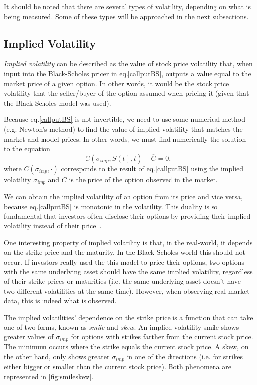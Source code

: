 It should be noted that there are several types of volatility, depending on what is being measured. Some of these types will be approached in the next subsections.

\subsection{Implied Volatility}
\label{section:impliedvolatility}
\emph{Implied volatility} can be described as the value of stock price volatility that, when input into the Black-Scholes pricer in eq.\eqref{callputBS}, outputs a value equal to the market price of a given option.
In other words, it would be the stock price volatility that the seller/buyer of the option assumed when pricing it (given that the Black-Scholes model was used).

Because eq.\eqref{callputBS} is not invertible, we need to use some numerical method (e.g. Newton's method) to find the value of implied volatility that matches the market and model prices. In other words, we must find numerically the solution to the equation
\begin{equation}\label{impvolform}
C(\sigma_{imp},S(t),t)-\overline{C}=0,
\end{equation}
\noindent where $C(\sigma_{imp},\cdot)$ corresponds to the result of eq.\eqref{callputBS} using the implied volatility $\sigma_{imp}$ and $\overline{C}$ is the price of the option observed in the market.

We can obtain the implied volatility of an option from its price and vice versa, because eq.\eqref{callputBS} is monotonic in the volatility. This duality is so fundamental that investors often disclose their options by providing their implied volatility instead of their price~\cite{Wilmott}.

One interesting property of implied volatility is that, in the real-world, it depends on the strike price and the maturity. In the Black-Scholes world this should not occur. If investors really used the this model to price their options, two options with the same underlying asset should have the same implied volatility, regardless of their strike prices or maturities (i.e. the same underlying asset doesn't have two different volatilities at the same time).
However, when observing real market data, this is indeed what is observed.

The implied volatilities' dependence on the strike price is a function that can take one of two forms, known as \emph{smile} and \emph{skew}.
An implied volatility smile shows greater values of $\sigma_{imp}$ for options with strikes farther from the current stock price. The minimum occurs where the strike equals the current stock price. A skew, on the other hand, only shows greater $\sigma_{imp}$ in one of the directions (i.e. for strikes either bigger or smaller than the current stock price). Both phenomena are represented in \autoref{fig:smileskew}.

